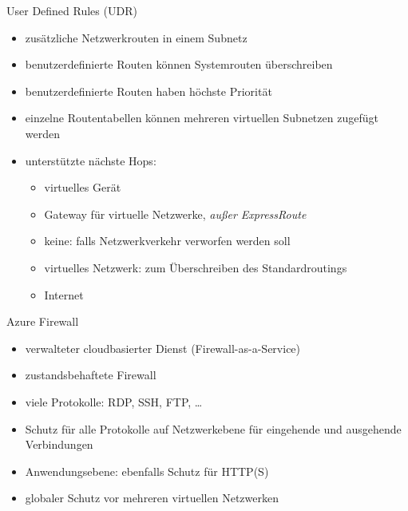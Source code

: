\begin{flashcard}[Definition]{User Defined Rules (UDR)}
    \begin{itemize}
        \item zusätzliche Netzwerkrouten in einem Subnetz
        \item benutzerdefinierte Routen können Systemrouten überschreiben
        \item benutzerdefinierte Routen haben höchste Priorität
        \item einzelne Routentabellen können mehreren virtuellen Subnetzen zugefügt werden
        \item unterstützte nächste Hops:
        \begin{itemize}
            \item virtuelles Gerät
            \item Gateway für virtuelle Netzwerke, \emph{außer ExpressRoute}
            \item keine: falls Netzwerkverkehr verworfen werden soll
            \item virtuelles Netzwerk: zum Überschreiben des Standardroutings
            \item Internet
        \end{itemize}

    \end{itemize}

\end{flashcard}

\begin{flashcard}[Definition]{Azure Firewall}
    \begin{itemize}
        \item verwalteter cloudbasierter Dienst (Firewall-as-a-Service)
        \item zustandsbehaftete Firewall
        \item viele Protokolle: RDP, SSH, FTP, \ldots
        \item Schutz für alle Protokolle auf Netzwerkebene für eingehende und ausgehende Verbindungen
        \item Anwendungsebene: ebenfalls Schutz für HTTP(S)
        \item globaler Schutz vor mehreren virtuellen Netzwerken
    \end{itemize}

\end{flashcard}


